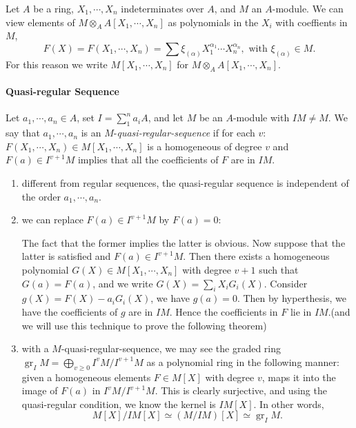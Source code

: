 Let \( A \) be a ring, \( X_1, \cdots, X_n \) indeterminates over \( A \), and \( M \) an \( A \)-module.
We can view elements of \( M \otimes_A A[X_1, \cdots, X_n] \) as polynomials in the \( X_i \) with coeffients in \( M \),
\[
  F(X) = F(X_1, \cdots, X_n) = \sum \xi_{(\alpha)}X^{\alpha_1}_1 \cdots X_{n}^{\alpha_n}, \text{ with } \xi_{(\alpha)} \in M.
\]
For this reason we write \( M[X_1, \cdots, X_n] \) for \( M \otimes_A A[X_1, \cdots, X_n] \).

\paragraph{Quasi-regular Sequence}

Let \( a_1, \cdots, a_n \in A \), set \( I = \sum_1^n a_i A \), and let \( M \) be an \( A \)-module with \( I M \neq M \).
We say that \( a_1, \cdots, a_n \) is an \( M \)-\emph{quasi-regular-sequence} if for each \( v \): \( F(X_1, \cdots, X_n) \in M[X_1, \cdots, X_n] \) is a homogeneous of degree \( v \) and \( F(a) \in I^{v + 1}M \) implies that all the coefficients of \( F \) are in \( IM \).

\begin{remark}
  \begin{enumerate}[label=\arabic*.]
    \item different from regular sequences, the quasi-regular sequence is independent of the order \( a_1, \cdots, a_n \).
    \item we can replace \( F(a) \in I^{v + 1}M \) by \( F(a) = 0 \):

      The fact that the former implies the latter is obvious.
      Now suppose that the latter is satisfied and \( F(a) \in I^{v + 1}M \).
      Then there exists a homogeneous polynomial \( G(X) \in M[X_1, \cdots, X_n] \) with degree \( v + 1 \) such that \( G(a) = F(a) \), and we write \( G(X) = \sum_i X_i G_i(X) \).
      Consider \( g(X) = F(X) - a_i G_i(X) \), we have \( g(a) = 0 \).
      Then by hyperthesis, we have the coefficients of \( g \) are in \( IM \).
      Hence the coefficients in \( F \) lie in \( IM \).(and we will use this technique to prove the following theorem)
    \item with a \( M \)-quasi-regular-sequence, we may see the graded ring \( \operatorname{gr}_I M = \bigoplus_{v \geq 0}I^v M / I^{v + 1}M \) as a polynomial ring in the following manner:
      given a homogeneous elements \( F \in M[X] \) with degree \( v \), maps it into the image of \( F(a) \) in \( I^v M / I^{v + 1}M \).
      This is clearly surjective, and using the quasi-regular condition, we know the kernel is \( IM[X] \).
      In other words,
      \[
        M[X] / IM[X] \simeq (M / IM)[X] \simeq \operatorname{gr}_IM.
      \]
  \end{enumerate}
\end{remark}
